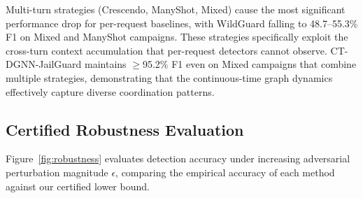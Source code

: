 \documentclass[journal]{IEEEtran}
\theoremstyle{plain}
\theoremstyle{definition}
\theoremstyle{remark}
\begin{document}
Multi-turn strategies (Crescendo, ManyShot, Mixed) cause the most significant performance drop for per-request baselines, with WildGuard falling to 48.7--55.3\% F1 on Mixed and ManyShot campaigns. These strategies specifically exploit the cross-turn context accumulation that per-request detectors cannot observe. CT-DGNN-JailGuard maintains $\geq$95.2\% F1 even on Mixed campaigns that combine multiple strategies, demonstrating that the continuous-time graph dynamics effectively capture diverse coordination patterns.

\subsection{Certified Robustness Evaluation}

Figure~\ref{fig:robustness} evaluates detection accuracy under increasing adversarial perturbation magnitude $\epsilon$, comparing the empirical accuracy of each method against our certified lower bound.
\end{document}
